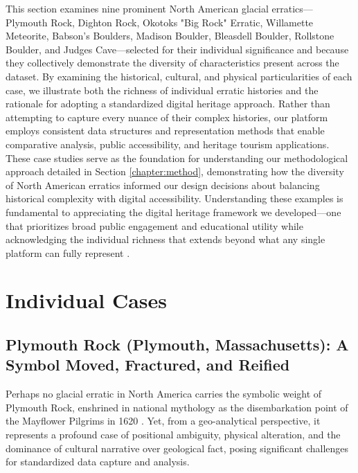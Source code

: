 This section examines nine prominent North American glacial erratics—Plymouth Rock, Dighton Rock, Okotoks "Big Rock" Erratic, Willamette Meteorite, Babson's Boulders, Madison Boulder, Bleasdell Boulder, Rollstone Boulder, and Judges Cave—selected for their individual significance and because they collectively demonstrate the diversity of characteristics present across the dataset. By examining the historical, cultural, and physical particularities of each case, we illustrate both the richness of individual erratic histories and the rationale for adopting a standardized digital heritage approach. Rather than attempting to capture every nuance of their complex histories, our platform employs consistent data structures and representation methods that enable comparative analysis, public accessibility, and heritage tourism applications. These case studies serve as the foundation for understanding our methodological approach detailed in Section \ref{chapter:method}, demonstrating how the diversity of North American erratics informed our design decisions about balancing historical complexity with digital accessibility. Understanding these examples is fundamental to appreciating the digital heritage framework we developed—one that prioritizes broad public engagement and educational utility while acknowledging the individual richness that extends beyond what any single platform can fully represent \cite{Cuffey2010, Delcourt1991}.

\section{Individual Cases}
\label{sec:individual_cases}

\subsection{Plymouth Rock (Plymouth, Massachusetts): A Symbol Moved, Fractured, and Reified}
\label{subsec:plymouth}

Perhaps no glacial erratic in North America carries the symbolic weight of Plymouth Rock, enshrined in national mythology as the disembarkation point of the Mayflower Pilgrims in 1620 \cite{Seelye1997}. Yet, from a geo-analytical perspective, it represents a profound case of positional ambiguity, physical alteration, and the dominance of cultural narrative over geological fact, posing significant challenges for standardized data capture and analysis.

